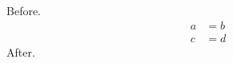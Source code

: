 \documentclass[12pt,fleqn,leqno]{article}
\begin{document}
Before.
\begin{align} a &= b \\ c &= d \end{align}
After.
\end{document}
